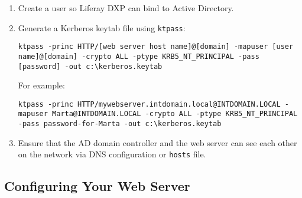 \begin{enumerate}
\def\labelenumi{\arabic{enumi}.}
\item
  Create a user so Liferay DXP can bind to Active Directory.
\item
  Generate a Kerberos keytab file using \texttt{ktpass}:

\begin{verbatim}
ktpass -princ HTTP/[web server host name]@[domain] -mapuser [user name]@[domain] -crypto ALL -ptype KRB5_NT_PRINCIPAL -pass [password] -out c:\kerberos.keytab
\end{verbatim}

  For example:

\begin{verbatim}
ktpass -princ HTTP/mywebserver.intdomain.local@INTDOMAIN.LOCAL -mapuser Marta@INTDOMAIN.LOCAL -crypto ALL -ptype KRB5_NT_PRINCIPAL -pass password-for-Marta -out c:\kerberos.keytab
\end{verbatim}
\item
  Ensure that the AD domain controller and the web server can see each
  other on the network via DNS configuration or \texttt{hosts} file.
\end{enumerate}

\subsection{Configuring Your Web
Server}\label{configuring-your-web-server}

